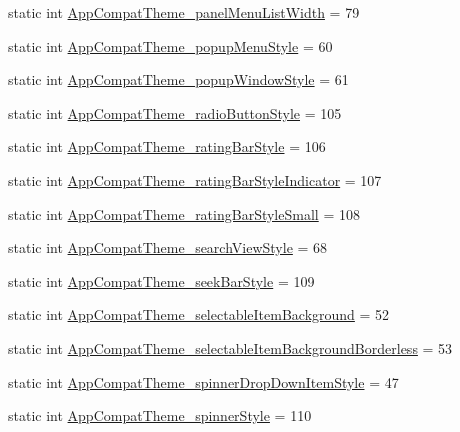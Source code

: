 \begin{DoxyCompactItemize}
\item 
static int \hyperlink{classandroid_1_1support_1_1v4_1_1R_1_1styleable_a9241d227f19a221bfd726409aaf1ba40}{App\+Compat\+Theme\+\_\+panel\+Menu\+List\+Width} = 79
\item 
static int \hyperlink{classandroid_1_1support_1_1v4_1_1R_1_1styleable_ae139527d680dba1ecff676f185c65505}{App\+Compat\+Theme\+\_\+popup\+Menu\+Style} = 60
\item 
static int \hyperlink{classandroid_1_1support_1_1v4_1_1R_1_1styleable_a36a238eb7c745d998ccfc9bd0e0d4e8c}{App\+Compat\+Theme\+\_\+popup\+Window\+Style} = 61
\item 
static int \hyperlink{classandroid_1_1support_1_1v4_1_1R_1_1styleable_a72d4902394fb50357cc43cdbde732b4c}{App\+Compat\+Theme\+\_\+radio\+Button\+Style} = 105
\item 
static int \hyperlink{classandroid_1_1support_1_1v4_1_1R_1_1styleable_a217122fd42bd5c2c280789d4142eb012}{App\+Compat\+Theme\+\_\+rating\+Bar\+Style} = 106
\item 
static int \hyperlink{classandroid_1_1support_1_1v4_1_1R_1_1styleable_ac0468ac4481514ec954acde9fbd2d3dc}{App\+Compat\+Theme\+\_\+rating\+Bar\+Style\+Indicator} = 107
\item 
static int \hyperlink{classandroid_1_1support_1_1v4_1_1R_1_1styleable_a82003426a43aa180e41d2b25450047c9}{App\+Compat\+Theme\+\_\+rating\+Bar\+Style\+Small} = 108
\item 
static int \hyperlink{classandroid_1_1support_1_1v4_1_1R_1_1styleable_ad107185a80adbb1be528d21aa3a5e644}{App\+Compat\+Theme\+\_\+search\+View\+Style} = 68
\item 
static int \hyperlink{classandroid_1_1support_1_1v4_1_1R_1_1styleable_ac401ab56daa8fcd20c0beb0413d8813f}{App\+Compat\+Theme\+\_\+seek\+Bar\+Style} = 109
\item 
static int \hyperlink{classandroid_1_1support_1_1v4_1_1R_1_1styleable_a3e75027080282e399085b17ac981b5be}{App\+Compat\+Theme\+\_\+selectable\+Item\+Background} = 52
\item 
static int \hyperlink{classandroid_1_1support_1_1v4_1_1R_1_1styleable_aabd8d4f3de97874973f63a4e93a5fd9a}{App\+Compat\+Theme\+\_\+selectable\+Item\+Background\+Borderless} = 53
\item 
static int \hyperlink{classandroid_1_1support_1_1v4_1_1R_1_1styleable_a0aa97271d74700457071ff210723f1c6}{App\+Compat\+Theme\+\_\+spinner\+Drop\+Down\+Item\+Style} = 47
\item 
static int \hyperlink{classandroid_1_1support_1_1v4_1_1R_1_1styleable_aeba225a2c69936da0d94609f5e139e48}{App\+Compat\+Theme\+\_\+spinner\+Style} = 110

\end{DoxyCompactItemize}
